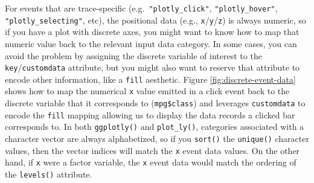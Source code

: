 \documentclass[
  12pt,
]{krantz}
\begin{document}
For events that are trace-specific (e.g.~\texttt{"plotly\_click"}, \texttt{"plotly\_hover"}, \texttt{"plotly\_selecting"}, etc), the positional data (e.g., \texttt{x}/\texttt{y}/\texttt{z}) is always numeric, so if you have a plot with discrete axes, you might want to know how to map that numeric value back to the relevant input data category. In some cases, you can avoid the problem by assigning the discrete variable of interest to the \texttt{key}/\texttt{customdata} attribute, but you might also want to reserve that attribute to encode other information, like a \texttt{fill} aesthetic. Figure \ref{fig:discrete-event-data} shows how to map the numerical \texttt{x} value emitted in a click event back to the discrete variable that it corresponds to (\texttt{mpg\$class}) and leverages \texttt{customdata} to encode the \texttt{fill} mapping allowing us to display the data records a clicked bar corresponds to. In both \texttt{ggplotly()} and \texttt{plot\_ly()}, categories associated with a character vector are always alphabetized, so if you \texttt{sort()} the \texttt{unique()} character values, then the vector indices will match the \texttt{x} event data values. On the other hand, if \texttt{x} were a factor variable, the \texttt{x} event data would match the ordering of the \texttt{levels()} attribute.
\end{document}
